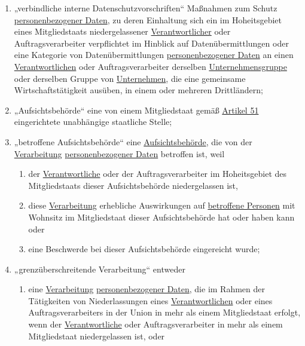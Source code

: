 \begin{enumerate}
  \item „verbindliche interne Datenschutzvorschriften“ Maßnahmen zum Schutz \hyperref[itm:04-1]{personenbezogener Daten}, zu deren Einhaltung
   sich ein im Hoheitsgebiet eines Mitgliedstaats niedergelassener \hyperref[itm:04-7]{Verantwortlicher} oder Auftragsverarbeiter
   verpflichtet im Hinblick auf Datenübermittlungen oder eine Kategorie von Datenübermittlungen \hyperref[itm:04-1]{personenbezogener Daten}
   an einen \hyperref[itm:04-7]{Verantwortlichen} oder Auftragsverarbeiter derselben \hyperref[itm:04-19]{Unternehmensgruppe} oder derselben Gruppe von
   \hyperref[itm:04-18]{Unternehmen}, die eine gemeinsame Wirtschaftstätigkeit ausüben, in einem oder mehreren Drittländern;
  \label{itm:04-20}

  \item „Aufsichtsbehörde“ eine von einem Mitgliedstaat gemäß \hyperref[ch:51]{Artikel 51} eingerichtete unabhängige
   staatliche Stelle;
  \label{itm:04-21}   

  \item „betroffene Aufsichtsbehörde“ eine \hyperref[itm:42-21]{Aufsichtsbehörde}, die von der \hyperref[itm:04-2]
   {Verarbeitung} \hyperref[itm:04-1]{personenbezogener Daten} betroffen ist, weil
  \label{itm:04-22}

  \begin{enumerate}

    \item der \hyperref[itm:04-7]{Verantwortliche} oder der Auftragsverarbeiter im Hoheitsgebiet des Mitgliedstaats dieser Aufsichtsbehörde
     niedergelassen ist,
    \label{itm:04-22a}

    \item diese \hyperref[itm:04-2]{Verarbeitung} erhebliche Auswirkungen auf \hyperref[itm:04-1]{betroffene Personen} mit Wohnsitz im Mitgliedstaat dieser
     Aufsichtsbehörde hat oder haben kann oder
    \label{itm:04-22b}

    \item eine Beschwerde bei dieser Aufsichtsbehörde eingereicht wurde;
  \label{itm:04-22c}

  \end{enumerate}

  \item „grenzüberschreitende Verarbeitung“ entweder
  \label{itm:04-23}

  \begin{enumerate}

    \item eine \hyperref[itm:04-2]{Verarbeitung} \hyperref[itm:04-1]{personenbezogener Daten}, die im Rahmen der Tätigkeiten von Niederlassungen eines
     \hyperref[itm:04-7]{Verantwortlichen} oder eines Auftragsverarbeiters in der Union in mehr als einem Mitgliedstaat erfolgt, wenn der
     \hyperref[itm:04-7]{Verantwortliche} oder Auftragsverarbeiter in mehr als einem Mitgliedstaat niedergelassen ist, oder
    \label{itm:04-23a}


\end{enumerate}
\end{enumerate}
